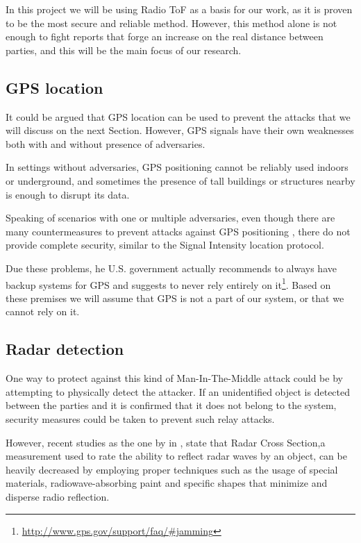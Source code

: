\documentclass{article}
\begin{document}
In this project we will be using Radio ToF as a basis for our work, as it is proven to be the most secure and reliable method. However, this method alone is not enough to fight reports that forge an increase on the real distance between parties, and this will be the main focus of our research.

\subsection{GPS location}

It could be argued that GPS location can be used to prevent the attacks that we will discuss on the next Section. However, GPS signals have their own weaknesses both with and without presence of adversaries.

In settings without adversaries, GPS positioning cannot be reliably used indoors or underground, and sometimes the presence of tall buildings or structures nearby is enough to disrupt its data.

Speaking of scenarios with one or multiple adversaries, even though there are many countermeasures to prevent attacks against GPS positioning \cite{warner2003gps, wen2005countermeasures, jafarnia2012gps}, there do not provide complete security, similar to the Signal Intensity location protocol.

Due these problems, he U.S. government actually recommends to always have backup systems for GPS and suggests to never rely entirely on it\footnote{\url{http://www.gps.gov/support/faq/#jamming}}. Based on these premises we will assume that GPS is not a part of our system, or that we cannot rely on it.

\subsection{Radar detection}

One way to protect against this kind of Man-In-The-Middle attack could be by attempting to physically detect the attacker. If an unidentified object is detected between the parties and it is confirmed that it does not belong to the system, security measures could be taken to prevent such relay attacks.

However, recent studies as the one by \citeauthor{cadirci2009rf} in \cite{cadirci2009rf}, state that Radar Cross Section,a measurement used to rate the ability to reflect radar waves by an object, can be heavily decreased by employing proper techniques such as the usage of special materials, radiowave-absorbing paint and specific shapes that minimize and disperse radio reflection.
\end{document}
